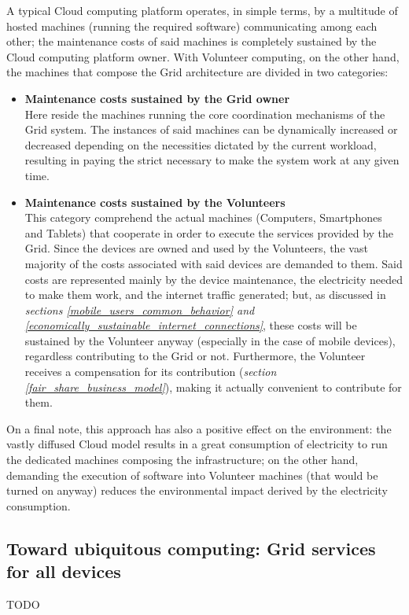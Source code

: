 A typical Cloud computing platform operates, in simple terms, by a multitude of hosted machines (running the required software) communicating among each other; the maintenance costs of said machines is completely sustained by the Cloud computing platform owner. With Volunteer computing, on the other hand, the machines that compose the Grid architecture are divided in two categories:
\begin{itemize}
    \item \textbf{Maintenance costs sustained by the Grid owner}\\
    Here reside the machines running the core coordination mechanisms of the Grid system. The instances of said machines can be dynamically increased or decreased depending on the necessities dictated by the current workload, resulting in paying the strict necessary to make the system work at any given time.
    \item \textbf{Maintenance costs sustained by the Volunteers}\\
    This category comprehend the actual machines (Computers, Smartphones and Tablets) that cooperate in order to execute the services provided by the Grid. Since the devices are owned and used by the Volunteers, the vast majority of the costs associated with said devices are demanded to them. Said costs are represented mainly by the device maintenance, the electricity needed to make them work, and the internet traffic generated; but, as discussed in \textit{sections \ref{mobile_users_common_behavior} and \ref{economically_sustainable_internet_connections}}, these costs will be sustained by the Volunteer anyway (especially in the case of mobile devices), regardless contributing to the Grid or not. Furthermore, the Volunteer receives a compensation for its contribution (\textit{section \ref{fair_share_business_model}}), making it actually convenient to contribute for them.
\end{itemize}

On a final note, this approach has also a positive effect on the environment: the vastly diffused Cloud model results in a great consumption of electricity to run the dedicated machines composing the infrastructure; on the other hand, demanding the execution of software into Volunteer machines (that would be turned on anyway) reduces the environmental impact derived by the electricity consumption.

\subsection{Toward ubiquitous computing: Grid services for all devices}\label{grid_services_for_all_devices}
TODO

